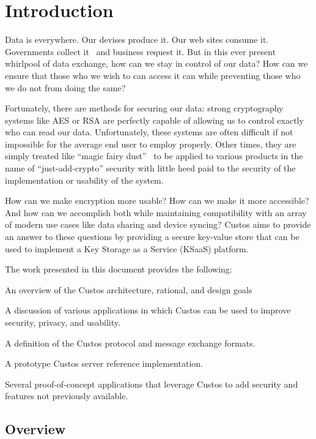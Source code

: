 \chapter{Introduction}
\label{chap:intro}

Data is everywhere. Our devises produce it. Our web sites consume
it. Governments collect it~\cite{GreenwaldPrism} and business request
it. But in this ever present whirlpool of data exchange, how can we
stay in control of our data? How can we ensure that those who we wish
to can access it can while preventing those who we do not from doing
the same?

Fortunately, there are methods for securing our data: strong
cryptography systems like AES or RSA are perfectly capable of allowing
us to control exactly who can read our data. Unfortunately, these
systems are often difficult if not impossible for the average end user
to employ properly. Other times, they are simply treated like ``magic
fairy dust''~\cite{Smith2003} to be applied to various products in the
name of ``just-add-crypto'' security with little heed paid to the
security of the implementation or usability of the system.

How can we make encryption more usable? How can we make it more
accessible? And how can we accomplish both while maintaining
compatibility with an array of modern use cases like data sharing and
device syncing? Custos aims to provide an answer to these questions by
providing a secure key-value store that can be used to implement a
Key Storage as a Service (KSaaS) platform.

The work presented in this document provides the following:

\begin{packed_item}
\item An overview of the Custos architecture, rational, and design goals
\item A discussion of various applications in which Custos can be used
  to improve security, privacy, and usability.
\item A definition of the Custos protocol and message exchange formats.
\item A prototype Custos server reference implementation.
\item Several proof-of-concept applications that leverage Custos to
  add security and features not previously available.
\end{packed_item}

\section{Overview}

